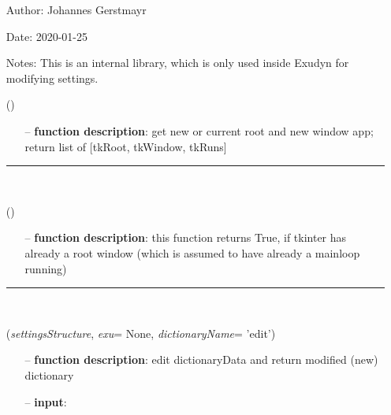 \begin{itemize}[leftmargin=1.4cm]
\begin{itemize}[leftmargin=1.4cm]
\begin{itemize}[leftmargin=0.5cm]
\begin{itemize}[leftmargin=1.4cm]
\begin{itemize}[leftmargin=1.4cm]
\begin{itemize}[leftmargin=0.5cm]
\begin{itemize}[leftmargin=1.4cm]
\begin{itemize}[leftmargin=0.5cm]
\begin{itemize}[leftmargin=1.4cm]
\setlength{\itemindent}{-1.4cm}
\item[]Author:    Johannes Gerstmayr
\item[]Date:      2020-01-25
\item[]Notes: 	This is an internal library, which is only used inside Exudyn for modifying settings.
\ei
\begin{flushleft}
\label{sec:GUI:GetTkRootAndNewWindow}
()
\end{flushleft}
\setlength{\itemindent}{0.7cm}
\begin{itemize}[leftmargin=0.7cm]
\item[--]
{\bf function description}: get new or current root and new window app; return list of [tkRoot, tkWindow, tkRuns]
\vspace{12pt}\end{itemize}
%
\noindent\rule{8cm}{0.75pt}\vspace{1pt} \\ 
\begin{flushleft}
\label{sec:GUI:TkRootExists}
()
\end{flushleft}
\setlength{\itemindent}{0.7cm}
\begin{itemize}[leftmargin=0.7cm]
\item[--]
{\bf function description}: this function returns True, if tkinter has already a root window (which is assumed to have already a mainloop running)
\vspace{12pt}\end{itemize}
%
\noindent\rule{8cm}{0.75pt}\vspace{1pt} \\ 
\begin{flushleft}
\label{sec:GUI:EditDictionaryWithTypeInfo}
({\it settingsStructure}, {\it exu}= None, {\it dictionaryName}= 'edit')
\end{flushleft}
\setlength{\itemindent}{0.7cm}
\begin{itemize}[leftmargin=0.7cm]
\item[--]
{\bf function description}: edit dictionaryData and return modified (new) dictionary
\item[--]
{\bf input}: \vspace{-6pt}

\end{itemize}
\end{itemize}
\end{itemize}
\end{itemize}
\end{itemize}
\end{itemize}
\end{itemize}
\end{itemize}
\end{itemize}
\end{itemize}
